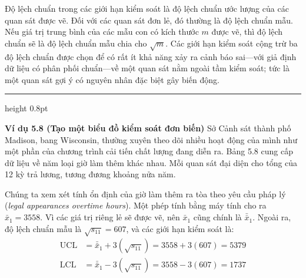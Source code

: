 Độ lệch chuẩn trong các giới hạn kiểm soát là độ lệch chuẩn ước lượng của các quan sát được vẽ. Đối với các quan sát đơn lẻ, đó thường là độ lệch chuẩn mẫu. Nếu giá trị trung bình của các mẫu con có kích thước $m$ được vẽ, thì độ lệch chuẩn sẽ là độ lệch chuẩn mẫu chia cho $\sqrt{m}$. Các giới hạn kiểm soát cộng trừ ba độ lệch chuẩn được chọn để có rất ít khả năng xảy ra cảnh báo sai—với giả định dữ liệu có phân phối chuẩn—về một quan sát nằm ngoài tầm kiểm soát; tức là một quan sát gợi ý có nguyên nhân đặc biệt gây biến động.

\vspace{0.8em}
\hrule height 0.8pt
\vspace{0.8em}

\noindent\textbf{Ví dụ 5.8 (Tạo một biểu đồ kiểm soát đơn biến)} Sở Cảnh sát thành phố Madison, bang Wisconsin, thường xuyên theo dõi nhiều hoạt động của mình như một phần của chương trình cải tiến chất lượng đang diễn ra. Bảng 5.8 cung cấp dữ liệu về năm loại giờ làm thêm khác nhau. Mỗi quan sát đại diện cho tổng của 12 kỳ trả lương, tương đương khoảng nửa năm.

Chúng ta xem xét tính ổn định của giờ làm thêm ra tòa theo yêu cầu pháp lý (\textit{legal appearances overtime hours}). Một phép tính bằng máy tính cho ra $\bar{x}_1 = 3558$. Vì các giá trị riêng lẻ sẽ được vẽ, nên $\bar{x}_1$ cũng chính là $\bar{\bar{x}}_1$. Ngoài ra, độ lệch chuẩn mẫu là $\sqrt{s_{11}} = 607$, và các giới hạn kiểm soát là:
\begin{align*}
    \text{UCL} &= \bar{\bar{x}}_1 + 3(\sqrt{s_{11}}) = 3558 + 3(607) = 5379 \\
    \text{LCL} &= \bar{\bar{x}}_1 - 3(\sqrt{s_{11}}) = 3558 - 3(607) = 1737
\end{align*}

